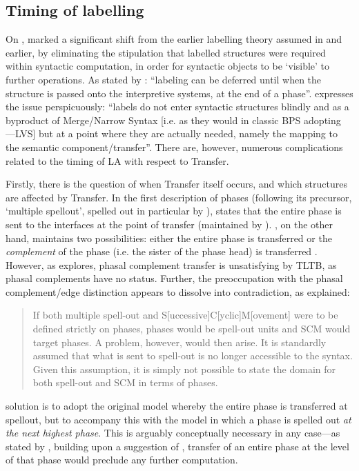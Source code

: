 \subsection{Timing of labelling}\label{sec:340}

On , \textcite{ChomskyN_2013} marked a significant shift from the earlier labelling theory assumed in \textcite{ChomskyN_2008} and earlier, by eliminating the stipulation that labelled structures were required within syntactic computation, in order for syntactic objects to be `visible' to further operations. As stated by \textcite[321]{RizziL_2015}: ``labeling can be deferred until when the structure is passed onto the interpretive systems, at the end of a phase''. \textcite[77]{BlumelA_2017a} expresses the issue perspicuously: ``labels do not enter syntactic structures blindly and as a byproduct of Merge/Narrow Syntax [i.e. as they would in classic BPS adopting ---LVS] but at a point where they are actually needed, namely the mapping to the semantic component/transfer''. There are, however, numerous complications related to the timing of LA with respect to Transfer.

Firstly, there is the question of when Transfer itself occurs, and which structures are affected by Transfer. In the first description of phases (following its precursor, `multiple spellout', spelled out in particular by ), \textcite[131-132]{ChomskyN_2000} states that the entire phase is sent to the interfaces at the point of transfer (maintained by ). \textcite{ChomskyN_2001}, on the other hand, maintains two possibilities: either the entire phase is transferred \parencite[12]{ChomskyN_2001} or the \textit{complement} of the phase (i.e. the sister of the phase head) is transferred \parencite[13]{ChomskyN_2001}. However, as \textcite{BoskovicZ_2016} explores, phasal complement transfer is unsatisfying by TLTB, as phasal complements have no status. Further, the preoccupation with the phasal complement/edge distinction appears to dissolve into contradiction, as explained:

\begin{quote}
     If both multiple spell-out and S[uccessive]C[yclic]M[ovement] were to be defined strictly on phases, phases would be spell-out units and SCM would target phases. A problem, however, would then arise. It is standardly assumed that what is sent to spell-out is no longer accessible to the syntax. Given this assumption, it is simply not possible to state the domain for both spell-out and SCM in terms of phases. \parencite[39]{BoskovicZ_2016}
\end{quote}
\noindent
{} solution is to adopt the original model whereby the entire phase is transferred at spellout, but to accompany this with the \textcite{ChomskyN_2001} model in which a phase is spelled out \emph{at the next highest phase}. This is arguably conceptually necessary in any case---as stated by \textcite[567]{RichardsMD_2007}, building upon a suggestion of \textcite{ChomskyN_2004}, transfer of an entire phase at the level of that phase would preclude any further computation.

